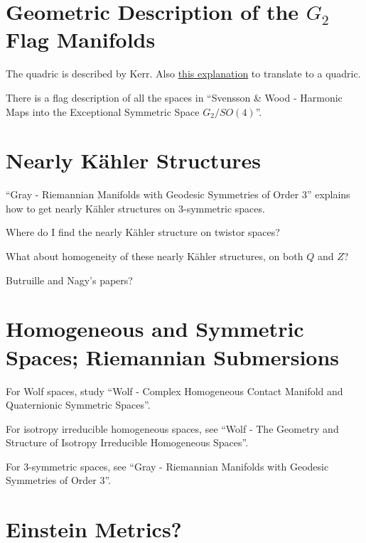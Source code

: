 \documentclass{scrartcl}
\begin{document}
\section{Geometric Description of the \texorpdfstring{$G_2$}{G2} Flag Manifolds}

The quadric is described by Kerr. Also \href{https://chat.stackexchange.com/transcript/36/2017/2/18}{this explanation} to translate to a quadric.

\medskip

There is a flag description of all the spaces in ``Svensson \& Wood - Harmonic Maps into the Exceptional Symmetric Space $G_2/SO(4)$''.


\section{Nearly K\"ahler Structures}

``Gray - Riemannian Manifolds with Geodesic Symmetries of Order 3'' explains how to get nearly K\"ahler structures on 3-symmetric spaces.

\medskip

Where do I find the nearly K\"ahler structure on twistor spaces?

\medskip

What about homogeneity of these nearly K\"ahler structures, on both $Q$ and $Z$?

\medskip

Butruille and Nagy's papers?

\section{Homogeneous and Symmetric Spaces; Riemannian Submersions}

For Wolf spaces, study ``Wolf - Complex Homogeneous Contact Manifold and Quaternionic Symmetric Spaces''.

\medskip

For isotropy irreducible homogeneous spaces, see ``Wolf - The Geometry and Structure of Isotropy Irreducible Homogeneous Spaces''. 

\medskip

For 3-symmetric spaces, see ``Gray - Riemannian Manifolds with Geodesic Symmetries of Order 3''.

\section{Einstein Metrics?}
\end{document}
